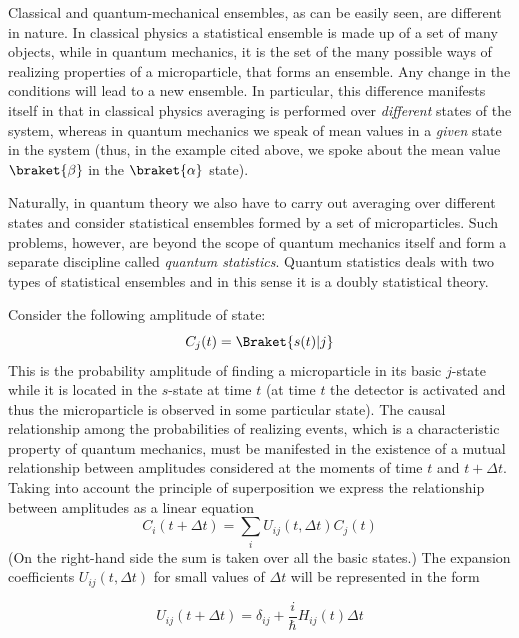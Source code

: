 \documentclass[a4paper,sfsidenotes,colorlinks=true]{tufte-book}
\numberwithin{equation}{section}
\numberwithin{figure}{section}
\begin{document}
Classical and quantum-mechanical ensembles, as can be easily seen, are
different in nature. In classical physics a statistical ensemble is
made up of a set of many objects, while in quantum mechanics, it is
the set of the many possible ways of realizing properties of a
microparticle, that forms an ensemble. Any change in the conditions
will lead to a new ensemble. In particular, this difference manifests
itself in that in classical physics averaging is performed over
\emph{different} states of the system, whereas in quantum mechanics we
speak of mean values in a \emph{given} state in the system (thus, in the
example cited above, we spoke about the mean value $\braket{\beta}$ in
the $\braket{\alpha}$ state).


Naturally, in quantum theory we also have to carry out
averaging over different states and consider statistical ensembles
formed by a set of microparticles. Such problems, however, are
beyond the scope of quantum mechanics itself and form a separate
discipline called \emph{quantum statistics}. Quantum statistics deals with
two types of statistical ensembles and in this sense it is a doubly
statistical theory.  

Consider the following amplitude of state:
\begin{equation}%
 C_{j} (t) = \Braket{s (t)| j} 
\label{eq-12.4}
\end{equation}
This is the probability amplitude of finding a microparticle in its
basic $j$-state while it is located in the $s$-state at time $t$ (at
time $t$ the detector is activated and thus the microparticle is
observed in some particular state). The causal relationship among the
probabilities of realizing events, which is a characteristic property
of quantum mechanics, must be manifested in the existence of a mutual
relationship between amplitudes considered at the moments of time $t$
and $t + \Delta t$. Taking into account the principle of superposition we
  express the relationship between amplitudes as a linear equation
\begin{equation}%
C_{i} (t + \Delta t) = \sum_{i} U_{ij}(t, \Delta t) C_{j}(t) 
\label{eq-12.5} 
\end{equation}
(On the right-hand side the sum is taken over all the basic states.)
The expansion coefficients $U_{ij} (t, \Delta t)$ for small values of
$\Delta t$ will be represented in the form

\begin{equation}%
U_{ij} (t + \Delta t) = \delta_{ij} + \frac{i}{\hbar} H_{ij}(t) \Delta t
\label{eq-12.6} 
\end{equation}
\end{document}
